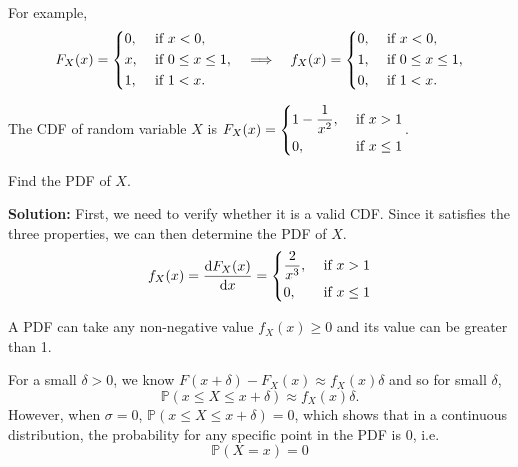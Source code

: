 For example, 
\[
    F_X(x) = \begin{dcases}
        0, &\text{ if } x < 0 ,\\
        x, &\text{ if } 0 \leq  x \leq 1 ,\\
        1, &\text{ if } 1 < x.
    \end{dcases}
    \quad\Longrightarrow\quad 
    f_X(x) = \begin{dcases}
        0, &\text{ if } x < 0 ,\\
        1, &\text{ if } 0 \leq x \leq 1 ,\\
        0, &\text{ if } 1 < x.
    \end{dcases}
\]

\begin{eg}
    The CDF of random variable \(X\) is \(F_X(x) = \begin{dcases}
        1 - \frac{1}{x^2}, &\text{ if } x > 1 \\
        0, &\text{ if } x \leq 1 
    \end{dcases}\). 
    
    Find the PDF of \(X\).

    \textbf{Solution:} 
    First, we need to verify whether it is a valid CDF. Since it satisfies the three properties, we can then determine the PDF of \(X\).
    \[
        f_X(x) = \frac{\mathrm{d}F_X(x)}{\mathrm{d}x} = \begin{dcases}
            \dfrac{2}{x^3}, &\text{ if } x > 1 \\
            0 , &\text{ if } x \leq 1 
        \end{dcases}
    \] 
\end{eg}
\begin{remark}
    A PDF can take any non-negative value \(f_X(x) \geq 0\) and its value can be greater than 1.
\end{remark}

For a small \(\delta > 0\), we know \(F(x + \delta) - F_X(x) \approx f_X (x)\delta\) and so for small \(\delta \), 
\[
    \mathbb{P}(x \leq X \leq x + \delta) \approx f_X(x)\delta. 
\]
However, when \(\sigma = 0\), \(\mathbb{P}(x \leq X \leq x + \delta) = 0\), which shows that in a continuous distribution, the probability for any specific point in the PDF is 0, i.e. 
\[
    \mathbb{P}(X = x) = 0
\]

